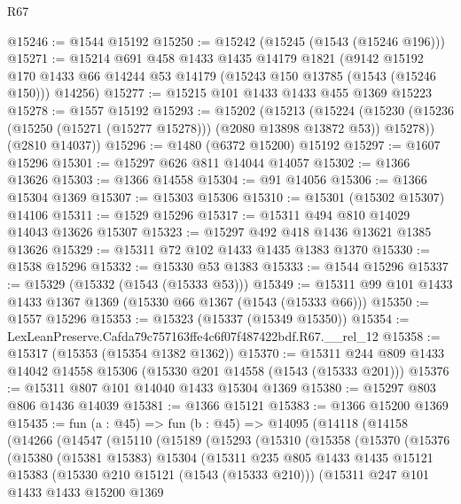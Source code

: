 \begin{lexlean}{R67}
\begin{coremodule}
@15246 := @1544 @15192
@15250 := @15242 (@15245 (@1543 (@15246 @196)))
@15271 := @15214
    @691
    @458
    @1433
    @1435
    @14179
    @1821
    (@9142
      @15192
      @170
      @1433
      @66
      @14244
      @53
      @14179
      (@15243 @150 @13785 (@1543 (@15246 @150)))
      @14256)
@15277 := @15215 @101 @1433 @1433 @455 @1369 @15223
@15278 := @1557 @15192
@15293 := @15202
    (@15213
      (@15224 (@15230 (@15236 (@15250 (@15271 (@15277 @15278))) (@2080 @13898 @13872 @53)) @15278))
      (@2810 @14037))
@15296 := @1480 (@6372 @15200) @15192
@15297 := @1607 @15296
@15301 := @15297 @626 @811 @14044 @14057
@15302 := @1366 @13626
@15303 := @1366 @14558
@15304 := @91 @14056
@15306 := @1366 @15304 @1369
@15307 := @15303 @15306
@15310 := @15301 (@15302 @15307) @14106
@15311 := @1529 @15296
@15317 := @15311 @494 @810 @14029 @14043 @13626 @15307
@15323 := @15297 @492 @418 @1436 @13621 @1385 @13626
@15329 := @15311 @72 @102 @1433 @1435 @1383 @1370
@15330 := @1538 @15296
@15332 := @15330 @53 @1383
@15333 := @1544 @15296
@15337 := @15329 (@15332 (@1543 (@15333 @53)))
@15349 := @15311 @99 @101 @1433 @1433 @1367 @1369 (@15330 @66 @1367 (@1543 (@15333 @66)))
@15350 := @1557 @15296
@15353 := @15323 (@15337 (@15349 @15350))
@15354 := LexLeanPreserve.Cafda79c757163ffe4c6f07f487422bdf.R67.__rel_12
@15358 := @15317 (@15353 (@15354 @1382 @1362))
@15370 := @15311 @244 @809 @1433 @14042 @14558 @15306 (@15330 @201 @14558 (@1543 (@15333 @201)))
@15376 := @15311 @807 @101 @14040 @1433 @15304 @1369
@15380 := @15297 @803 @806 @1436 @14039
@15381 := @1366 @15121
@15383 := @1366 @15200 @1369
@15435 := fun (a : @45) =>
  fun (b : @45) =>
  @14095
    (@14118
      (@14158
        (@14266
          (@14547
            (@15110
              (@15189
                (@15293
                  (@15310
                    (@15358
                      (@15370
                        (@15376
                          (@15380
                            (@15381 @15383)
                            @15304
                            (@15311
                              @235
                              @805
                              @1433
                              @1435
                              @15121
                              @15383
                              (@15330 @210 @15121 (@1543 (@15333 @210)))
                              (@15311
                                @247
                                @101
                                @1433
                                @1433
                                @15200
                                @1369

\end{coremodule}
\end{lexlean}
